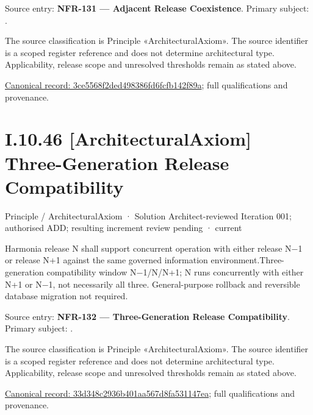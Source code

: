 Source entry: \textbf{NFR-131 — Adjacent Release Coexistence}. Primary subject: \texttt{}.



The source classification is Principle «ArchitecturalAxiom». The source identifier is a scoped register reference and does not determine architectural type. Applicability, release scope and unresolved thresholds remain as stated above.


{\footnotesize \href{../../../../../../../../continuum/motivation/principle/architectural-axiom/3ce5568f2ded498386fd6fcfb142f89a.md}{Canonical record: 3ce5568f2ded498386fd6fcfb142f89a}; full qualifications and provenance.}\par
\section*{I.10.46 [ArchitecturalAxiom] Three-Generation Release Compatibility}
\label{navigation:I.10.46}

\label{element:33d348c2936b401aa567d8fa531147ea}
{\small Principle / ArchitecturalAxiom · Solution Architect-reviewed Iteration 001; authorised ADD; resulting increment review pending · current}\par

Harmonia release N shall support concurrent operation with either release N−1 or release N+1 against the same governed information environment.Three-generation compatibility window N−1/N/N+1; N runs concurrently with either N+1 or N−1, not necessarily all three. General-purpose rollback and reversible database migration not required.



Source entry: \textbf{NFR-132 — Three-Generation Release Compatibility}. Primary subject: \texttt{}.



The source classification is Principle «ArchitecturalAxiom». The source identifier is a scoped register reference and does not determine architectural type. Applicability, release scope and unresolved thresholds remain as stated above.


{\footnotesize \href{../../../../../../../../continuum/motivation/principle/architectural-axiom/33d348c2936b401aa567d8fa531147ea.md}{Canonical record: 33d348c2936b401aa567d8fa531147ea}; full qualifications and provenance.}\par
